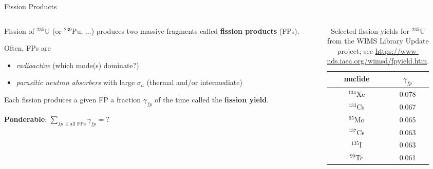 \documentclass[aspectratio=1610]{beamer}
\begin{document}
\begin{frame}[fragile]{Fission Products}
 

\begin{columns}[T,onlytextwidth]

\begin{column}{0.5\textwidth}
 
Fission of ${}^{235}$U (or ${}^{239}$Pu, ...) produces two
massive fragments called {\bf fission products} (FPs).

\vspace{0.25cm}

Often, FPs are
\begin{itemize}
 \item {\it radioactive} (which mode(s) dominate?)
 \item {\it parasitic 
       neutron absorbers} with large $\sigma_a$ (thermal and/or intermediate)
\end{itemize}

\vspace{0.25cm}

Each fission produces a given FP a fraction 
$\gamma_{fp}$ of the time called the {\bf fission yield}. 

\vspace{0.25cm}
{\bf Ponderable}: $\sum_{fp \, \in \text{all FPs}} \gamma_{fp} = ?$

 
\end{column}

\begin{column}{0.5\textwidth}

\begin{table}
 \begin{tabular}{cc}
  \toprule
  nuclide &  $\gamma_{fp}$ \\
  \midrule
  ${}^{134}$Xe & 0.078\\
  ${}^{133}$Cs & 0.067\\
  ${}^{95}$Mo & 0.065\\
  ${}^{137}$Cs & 0.063\\
  ${}^{135}$I & 0.063\\
  ${}^{99}$Tc & 0.061\\
  \bottomrule
 \end{tabular}
 \caption{Selected fission yields for ${}^{235}$U from the WIMS Library Update project; see \url{https://www-nds.iaea.org/wimsd/fpyield.htm}.}
\end{table}


\end{column}

\end{columns}

\end{frame}
\end{document}
